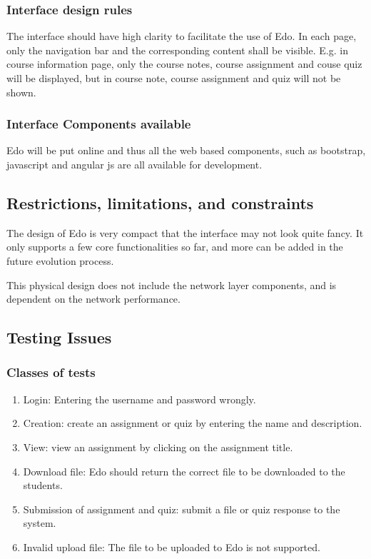 \documentclass[paper=a4, fontsize=11pt]{scrartcl}
\numberwithin{equation}{section}		%
\numberwithin{figure}{section}			%
\numberwithin{table}{section}				%
\begin{document}
\subsubsection{Interface design rules}
The interface should have high clarity to facilitate the use of Edo. In each page, only the navigation bar and the corresponding content shall be visible. E.g. in course information page, only the course notes, course assignment and couse quiz will be displayed, but in course note, course assignment and quiz will not be shown.

\subsubsection{Interface Components available}
Edo will be put online and thus all the web based components, such as bootstrap, javascript and angular js are all available for development. 


\subsection{Restrictions, limitations, and constraints}
The design of Edo is very compact that the interface may not look quite fancy. It only supports a few core functionalities so far, and more can be added in the future evolution process.

This physical design does not include the network layer components, and is dependent on the network performance.
\subsection{Testing Issues}

\subsubsection{Classes of tests}
\begin{enumerate}
	\item Login: Entering the username and password wrongly.
	\item Creation: create an assignment or quiz by entering the name and description.
	\item View: view an assignment by clicking on the assignment title.
	\item Download file: Edo should return the correct file to be downloaded to the students.
	\item Submission of assignment and quiz: submit a file or quiz response to the system.
	\item Invalid upload file: The file to be uploaded to Edo is not supported.
\end{enumerate}
\end{document}
